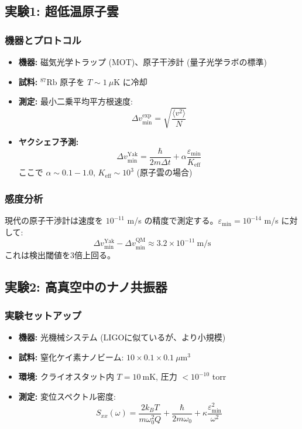 \documentclass[11pt,a4paper]{article}
\begin{document}
	\subsection{実験1: 超低温原子雲}
	
	\subsubsection{機器とプロトコル}
	\begin{itemize}
		\item \textbf{機器:} 磁気光学トラップ (MOT)、原子干渉計 (量子光学ラボの標準)
		\item \textbf{試料:} $^{87}\text{Rb}$ 原子を $T \sim 1\ \mu\text{K}$ に冷却
		\item \textbf{測定:} 最小二乗平均平方根速度:
		\[
		\Delta v_{\min}^{\text{exp}} = \sqrt{\frac{\langle v^2 \rangle}{N}}
		\]
		\item \textbf{ヤクシェフ予測:}
		\[
		\Delta v_{\min}^{\text{Yak}} = \frac{\hbar}{2m\Delta t} + \alpha \frac{\varepsilon_{\min}}{K_{\mathrm{eff}}}
		\]
		ここで $\alpha \sim 0.1-1.0$, $K_{\mathrm{eff}} \sim 10^3$ (原子雲の場合)
	\end{itemize}
	
	\subsubsection{感度分析}
	
	現代の原子干渉計は速度を $10^{-11}$ m/s の精度で測定する。$\varepsilon_{\min} = 10^{-14}$ m/s に対して:
	\[
	\Delta v_{\min}^{\text{Yak}} - \Delta v_{\min}^{\text{QM}} \approx 3.2 \times 10^{-11}\ \text{m/s}
	\]
	これは検出閾値を3倍上回る。
	
	\subsection{実験2: 高真空中のナノ共振器}
	
	\subsubsection{実験セットアップ}
	\begin{itemize}
		\item \textbf{機器:} 光機械システム (LIGOに似ているが、より小規模)
		\item \textbf{試料:} 窒化ケイ素ナノビーム: $10 \times 0.1 \times 0.1\ \mu\text{m}^3$
		\item \textbf{環境:} クライオスタット内 $T = 10\ \text{mK}$, 圧力 $< 10^{-10}$ torr
		\item \textbf{測定:} 変位スペクトル密度:
		\[
		S_{xx}(\omega) = \frac{2k_B T}{m\omega_0^2 Q} + \frac{\hbar}{2m\omega_0} + \kappa\frac{\varepsilon_{\min}^2}{\omega^2}
		\]
	\end{itemize}
	
\end{document}

